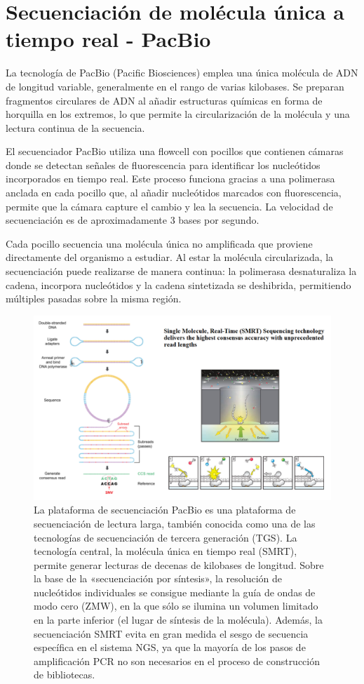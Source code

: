 \section{Secuenciación de molécula única a tiempo real - PacBio}
La tecnología de PacBio (Pacific Biosciences) emplea una única molécula de ADN de longitud variable, generalmente en el rango de varias kilobases. Se preparan fragmentos circulares de ADN al añadir estructuras químicas en forma de horquilla en los extremos, lo que permite la circularización de la molécula y una lectura continua de la secuencia.

El secuenciador PacBio utiliza una flowcell con pocillos que contienen cámaras donde se detectan señales de fluorescencia para identificar los nucleótidos incorporados en tiempo real. Este proceso funciona gracias a una polimerasa anclada en cada pocillo que, al añadir nucleótidos marcados con fluorescencia, permite que la cámara capture el cambio y lea la secuencia. La velocidad de secuenciación es de aproximadamente 3 bases por segundo.

Cada pocillo secuencia una molécula única no amplificada que proviene directamente del organismo a estudiar. Al estar la molécula circularizada, la secuenciación puede realizarse de manera continua: la polimerasa desnaturaliza la cadena, incorpora nucleótidos y la cadena sintetizada se deshibrida, permitiendo múltiples pasadas sobre la misma región.

\begin{figure}[htbp]
\centering
\includegraphics[width = \textwidth]{figs/pacbio.png}
\caption{La plataforma de secuenciación PacBio es una plataforma de secuenciación de lectura larga, también conocida como una de las tecnologías de secuenciación de tercera generación (TGS). La tecnología central, la molécula única en tiempo real (SMRT), permite generar lecturas de decenas de kilobases de longitud. Sobre la base de la «secuenciación por síntesis», la resolución de nucleótidos individuales se consigue mediante la guía de ondas de modo cero (ZMW), en la que sólo se ilumina un volumen limitado en la parte inferior (el lugar de síntesis de la molécula). Además, la secuenciación SMRT evita en gran medida el sesgo de secuencia específica en el sistema NGS, ya que la mayoría de los pasos de amplificación PCR no son necesarios en el proceso de construcción de bibliotecas.}
\end{figure}

